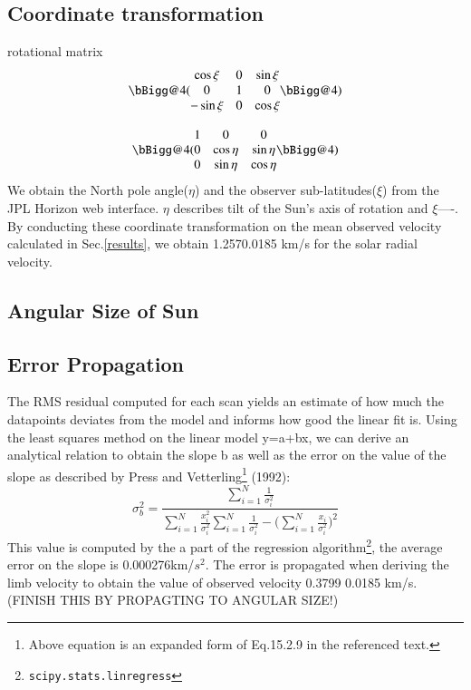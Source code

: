 \documentclass[authoryear, 12pt,5p, times]{elsarticle}
\newcommand{\rpm}{\raisebox{.3ex}{$\scriptstyle\pm$}}
\begin{document}
\subsection{Coordinate transformation}
rotational matrix
\begin{equation}
\bBigg@{4}(\begin{matrix}
\cos\xi & 0 &\sin\xi \\ 
0 &1  &0 \\ 
-\sin\xi &0  &\cos\xi 
\end{matrix}\bBigg@{4})
\label{rotmatrix1}
\end{equation}

\begin{equation}
\bBigg@{4}(\begin{matrix}
1& 0 &0 \\ 
0 &\cos\eta  &\sin\eta \\ 
0 &\sin \eta  &\cos\eta 
\end{matrix}\bBigg@{4})
\label{rotmatrix2}
\end{equation}
We obtain the North pole angle($\eta$) and the observer sub-latitudes($\xi$) from the JPL Horizon web interface.
$\eta$ describes tilt of the Sun's axis of rotation and $\xi $----.
By conducting these coordinate transformation on the mean observed velocity calculated in Sec.\ref{results}, we obtain 1.257\rpm 0.0185 km/s for the solar radial velocity.
\subsection{Angular Size of Sun}
\label{size_calc}
\subsection{Error Propagation}
The RMS residual  computed for each scan yields an estimate of how much the datapoints deviates from the model and informs how good the linear fit is.  Using the least squares method on the linear model y=a+bx, we can derive an analytical relation to obtain the slope b as well as the error on the value of the slope as described by Press and Vetterling\footnote{Above equation is an expanded form of  Eq.15.2.9 in the referenced text.}  (1992): 
\begin{equation}
\sigma_b^2 = \frac{\sum\limits_{i=1}^N\frac{1}{\sigma_i^2}}{\sum\limits_{i=1}^N\frac{x_i^2}{\sigma_i^2}\sum\limits_{i=1}^N\frac{1}{\sigma_i^2}-\Big(\sum\limits_{i=1}^N\frac{x_i}{\sigma_i^2}\Big)^2}
\label{ls}
\end{equation}
This value is computed by the a part of the regression algorithm\footnote{\texttt{scipy.stats.linregress}}, the average error on the slope is 0.000276km/$s^2$. The error is propagated when deriving the limb velocity to obtain the value of observed velocity  0.3799 \rpm 0.0185 km/s. (FINISH THIS BY PROPAGTING TO ANGULAR SIZE!)
\end{document}
